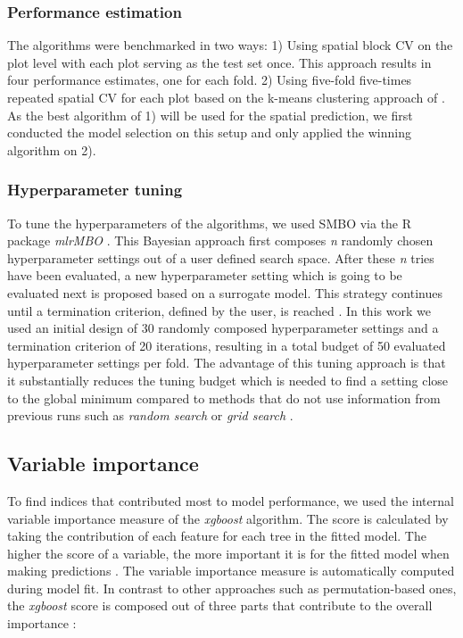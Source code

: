 \documentclass[review]{elsarticle}
\begin{document}
\subsubsection{Performance estimation}

\noindent The algorithms were benchmarked in two ways:
1) Using spatial block \ac{CV} on the plot level with each plot serving as the test set once.
This approach results in four performance estimates, one for each fold.
2) Using five-fold five-times repeated spatial \ac{CV} for each plot based on the k-means clustering approach of \cite{sperrorest}.
As the best algorithm of 1) will be used for the spatial prediction, we first conducted the model selection on this setup and only applied the winning algorithm on 2).


\subsubsection{Hyperparameter tuning}

\noindent To tune the hyperparameters of the algorithms, we used \ac{SMBO} via the R package \textit{mlrMBO} \citep{mlrMBO}.
This Bayesian approach first composes \textit{n} randomly chosen hyperparameter settings out of a user defined search space.
After these \textit{n} tries have been evaluated, a new hyperparameter setting which is going to be evaluated next is proposed based on a surrogate model.
This strategy continues until a termination criterion, defined by the user, is reached \citep{Hutter2011, Jones1998}.
In this work we used an initial design of 30 randomly composed hyperparameter settings and a termination criterion of 20 iterations, resulting in a total budget of 50 evaluated hyperparameter settings per fold.
The advantage of this tuning approach is that it substantially reduces the tuning budget which is needed to find a setting close to the global minimum compared to methods that do not use information from previous runs such as \textit{random search} or \textit{grid search} \citep{Bergstra2012}.

\subsection{Variable importance}

\noindent To find indices that contributed most to model performance, we used the internal variable importance measure of the \textit{xgboost} algorithm.
The score is calculated by taking the contribution of each feature for each tree in the fitted model.
The higher the score of a variable, the more important it is for the fitted model when making predictions \citep{chenXGBoostScalableTree2016}.
The variable importance measure is automatically computed during model fit.
In contrast to other approaches such as permutation-based ones, the \textit{xgboost} score is composed out of three parts that contribute to the overall importance \citep{chenXGBoostScalableTree2016}:
\end{document}
